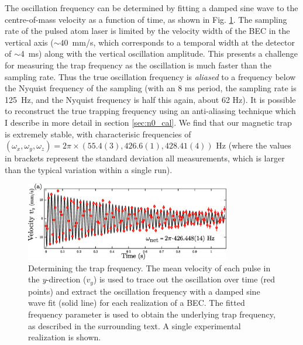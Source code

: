 	The oscillation frequency can be determined by fitting a damped sine wave to the centre-of-mass velocity as a function of time, as shown in Fig. \ref{fig:trap_freq_eg}.
	The sampling rate of the pulsed atom laser is limited by the velocity width of the BEC in the vertical axis (\(\sim40\)~mm/s, which corresponds to a temporal width at the detector of \(\sim\)4~ms) along with the vertical oscillation amplitude. This presents a challenge for measuring the trap frequency as the oscillation is much faster than the sampling rate. 
	Thus the true oscillation frequency is \emph{aliased} to a frequency below the Nyquist frequency of the sampling (with an 8 ms period, the sampling rate is 125~Hz, and the Nyquist frequency is half this again, about 62 Hz).
	It is possible to reconstruct the true trapping frequency using an anti-aliasing technique which I describe in more detail in section \ref{sec:n0_cal}.
	We find that our magnetic trap is extremely stable, with characterisic frequencies of $(\omega_x,\omega_y,\omega_z)= 2\pi\times(55.4(3),426.6(1),428.41(4))$ Hz (where the values in brackets represent the standard deviation all measurements, which is larger than the typical variation within a single run).
	\begin{figure}
	\centering
		\includegraphics[width=0.8\textwidth]{fig/tuneout/trap_freq_eg}
			\caption{ Determining the trap frequency. The mean velocity of each pulse in the \textit{y}-direction ($v_y$) is used to trace out the oscillation over time (red points) and extract the oscillation frequency with a damped sine wave fit (solid line) for each realization of a BEC. The fitted frequency parameter is used to obtain the underlying trap frequency, as described in the surrounding text. A single experimental realization is shown.}
			\label{fig:trap_freq_eg}
	\end{figure}	
	
